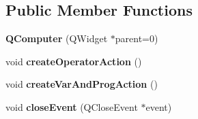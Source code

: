 \subsection*{Public Member Functions}
\begin{DoxyCompactItemize}
\item 
{\bfseries Q\+Computer} (Q\+Widget $\ast$parent=0)\hypertarget{class_q_computer_a3a71a18fabd57942cf0d85a916d31624}{}\label{class_q_computer_a3a71a18fabd57942cf0d85a916d31624}

\item 
void {\bfseries create\+Operator\+Action} ()\hypertarget{class_q_computer_aa8efe96b7342f9e32778658fe6964565}{}\label{class_q_computer_aa8efe96b7342f9e32778658fe6964565}

\item 
void {\bfseries create\+Var\+And\+Prog\+Action} ()\hypertarget{class_q_computer_a1ffbe2fffbe11e7916f599337f51b805}{}\label{class_q_computer_a1ffbe2fffbe11e7916f599337f51b805}

\item 
void {\bfseries close\+Event} (Q\+Close\+Event $\ast$event)\hypertarget{class_q_computer_aec79b2c7edaa9637eb83d4e5f2f369c8}{}\label{class_q_computer_aec79b2c7edaa9637eb83d4e5f2f369c8}

\end{DoxyCompactItemize}
